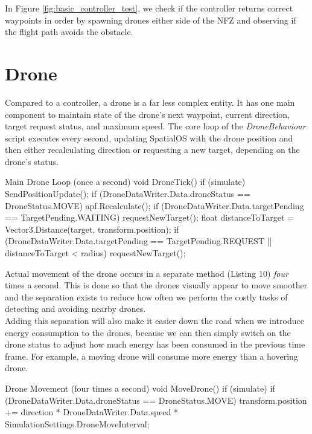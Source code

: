 \documentclass[a4paper,11pt,titlepage]{report}
\begin{document}
In Figure \ref{fig:basic_controller_test}, we check if the controller returns correct waypoints in order by spawning drones either side of the NFZ and observing if the flight path avoids the obstacle.

\section{Drone}
Compared to a controller, a drone is a far less complex entity. It has one main component to maintain state of the drone's next waypoint, current direction, target request status, and maximum speed. The core loop of the \textit{DroneBehaviour} script executes every second, updating SpatialOS with the drone position and then either recalculating direction or requesting a new target, depending on the drone's status.

\begin{sexylisting}[colback=white]{Main Drone Loop (once a second)}
void DroneTick()
{
  if (simulate)
  {
    SendPositionUpdate();
    if (DroneDataWriter.Data.droneStatus == DroneStatus.MOVE)
    {
      apf.Recalculate();
    }
    if (DroneDataWriter.Data.targetPending == TargetPending.WAITING)
    {
      requestNewTarget();
    }
    float distanceToTarget = Vector3.Distance(target, transform.position);
    if (DroneDataWriter.Data.targetPending == TargetPending.REQUEST
      || distanceToTarget < radius)
    {
      requestNewTarget();
    }
  }
}
\end{sexylisting}

Actual movement of the drone occurs in a separate method (Listing 10) \textit{four} times a second. This is done so that the drones visually appear to move smoother and the separation exists to reduce how often we perform the costly tasks of detecting and avoiding nearby drones.\\

Adding this separation will also make it easier down the road when we introduce energy consumption to the drones, because we can then simply switch on the drone status to adjust how much energy has been consumed in the previous time frame. For example, a moving drone will consume more energy than a hovering drone.

\begin{sexylisting}[colback=white]{Drone Movement (four times a second)}
void MoveDrone()
{
  if (simulate)
  {
    if (DroneDataWriter.Data.droneStatus == DroneStatus.MOVE)
    {
      transform.position += direction * DroneDataWriter.Data.speed
        * SimulationSettings.DroneMoveInterval;
    }
  }
}
\end{sexylisting}
\end{document}
